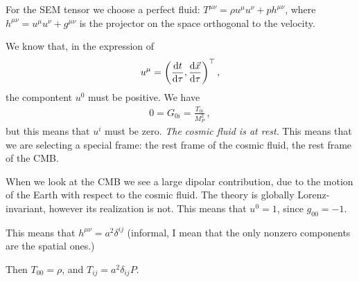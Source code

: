 \documentclass[main.tex]{subfiles}
\begin{document}
For the SEM tensor we choose a perfect fluid: \(T^{\mu \nu } = \rho u^{\mu } u^{\nu }  + p h^{ \mu \nu }\), where \(h^{\mu \nu } = u^{ \mu }  u^{\nu } + g^{ \mu \nu }\) is the projector on the space orthogonal to the velocity. 

We know that, in the expression of 
%
\begin{align}
  u^{\mu } = \qty(\dv{t}{\tau }, \dv{\vec{x}}{\tau })^{\top}
\,,
\end{align}
%
the compontent \(u^{0}\) must be positive. We have 
%
\begin{align}
  0 = G_{0i} = \frac{T_{0i} }{M_P^2}
\,,
\end{align}
%
but this means that \(u^{i}\) must be zero. \emph{The cosmic fluid is at rest}. This means that we are selecting a special frame: the rest frame of the cosmic fluid, the rest frame of the CMB. 

When we look at the CMB we see a large dipolar contribution, due to the motion of the Earth with respect to the cosmic fluid. 
The theory is globally Lorenz-invariant, however its realization is not. This means that \(u^{0} = 1\), since \(g_{00} = -1\). 

This means that \(h^{\mu \nu } = a^2 \delta^{ij}\) (informal, I mean that the only nonzero components are the spatial ones.)

Then \(T_{00} = \rho \), and \(T_{ij} = a^2 \delta_{ij} P\). 
\end{document}
